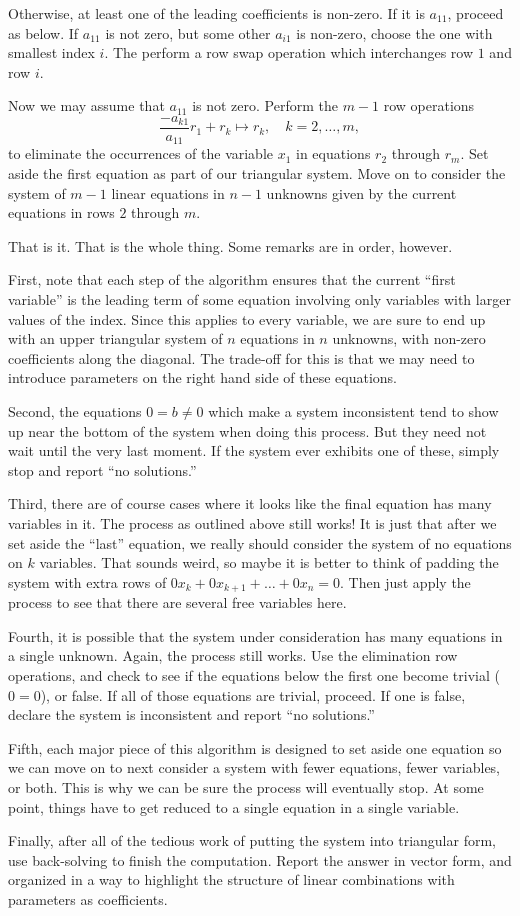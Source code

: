 \documentclass[00-livre-main.tex]{subfiles}
\begin{document}
Otherwise, at least one of the leading coefficients is non-zero. If it is $a_{11}$, proceed as below. If $a_{11}$ is not zero, but some other $a_{i1}$ is non-zero, choose the one with smallest index $i$. The perform a row swap operation which interchanges row $1$ and row $i$.

Now we may assume that $a_{11}$ is not zero. Perform the $m-1$ row operations
\[
\frac{-a_{k1}}{a_{11}} r_1 + r_k \mapsto r_k, \quad k=2,\ldots, m,
\]
to eliminate the occurrences of the variable $x_1$ in equations $r_2$ through $r_m$.
Set aside the first equation as part of our triangular system. Move on to consider the 
system of $m-1$ linear equations in $n-1$ unknowns given by the current equations in rows $2$ through $m$.


That is it. That is the whole thing. Some remarks are in order, however.

First, note that each step of the algorithm ensures that the current ``first variable'' is the leading term of some equation involving only variables with larger values of the index. Since this applies to every variable, we are sure to end up with an upper triangular system of $n$ equations in $n$ unknowns, with non-zero coefficients along the diagonal. The trade-off for this is that we may need to introduce parameters on the right hand side of these equations.

Second, the equations $0=b\neq 0$ which make a system inconsistent tend to show up near the bottom of the system when doing this process. But they need not wait until the very last moment. If the system ever exhibits one of these, simply stop and report ``no solutions.''

Third, there are of course cases where it looks like the final equation has many variables in it. The process as outlined above still works! It is just that after we set aside the ``last'' equation, we really should consider the system of no equations on $k$ variables. That sounds weird, so maybe it is better to think of padding the system with extra rows of $0x_k + 0x_{k+1} + \dots +0x_n = 0$. Then just apply the process to see that there are several free variables here.

Fourth, it is possible that the system under consideration has many equations in a single unknown. Again, the process still works. Use the elimination row operations, and check to see if the equations below the first one become trivial ($0=0$), or false. If all of those equations are trivial, proceed. If one is false, declare the system is inconsistent and report ``no solutions.''

Fifth, each major piece of this algorithm is designed to set aside one equation so we can move on to next consider a system with fewer equations, fewer variables, or both. This is why we can be sure the process will eventually stop. At some point, things have to get reduced to a single equation in a single variable.


Finally, after all of the tedious work of putting the system into triangular form, use back-solving to finish the computation. Report the answer in vector form, and organized in a way to highlight the structure of linear combinations with parameters as coefficients.
\end{document}
